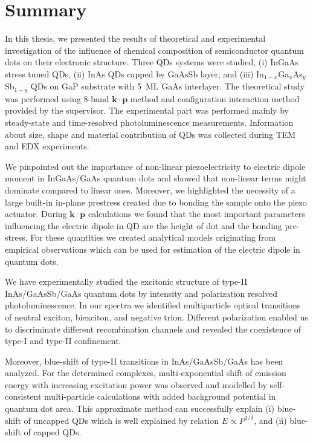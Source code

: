 
\chapter{Summary}\label{chap:summary}

In this thesis, we presented the results of theoretical and experimental investigation of the influence of chemical composition of semiconductor quantum dots on their electronic structure. Three QDs systems were studied, (i) InGaAs stress tuned QDs, (ii) InAs QDs capped by GaAsSb layer, and (iii) In$_{1-x}$Ga$_x$As$_y$Sb$_{1-y}$ QDs on GaP substrate with 5~ML GaAs interlayer. The theoretical study was performed using 8-band $\mathbf{k\cdot p}$ method and configuration interaction method provided by the supervisor. The experimental part was performed mainly by steady-state and time-resolved photoluminescence measurements. Information about size, shape and material contribution of QDs was collected during TEM and EDX experiments.

We pinpointed out the importance of non-linear piezoelectricity to electric dipole moment in InGaAs/GaAs quantum dots and showed that non-linear terms might dominate compared to linear ones. Moreover, we highlighted the necessity of a large built-in in-plane prestress created due to bonding the sample onto the piezo actuator. During $\mathbf{k\cdot p}$ calculations we found that the most important parameters influencing the electric dipole in QD are the height of dot and the bonding pre-stress. For these quantities we created analytical models originating from empirical observations which can be used for estimation of the electric dipole in quantum dots.

We have experimentally studied the excitonic structure of type-II InAs/GaAsSb/GaAs quantum dots by intensity and polarization resolved photoluminescence. In our spectra we identified multiparticle optical transitions of neutral exciton, biexciton, and negative trion. Different polarization enabled us to discriminate different recombination channels and revealed the coexistence of type-I and type-II confinement.

Moreover, blue-shift of type-II transitions in InAs/GaAsSb/GaAs has been analyzed. For the determined complexes, multi-exponential shift of emission energy with increasing excitation power was observed and modelled by self-consistent multi-particle calculations with added background potential in quantum dot area. This approximate method can successfully explain (i) blue-shift of uncapped QDs which is well explained by relation $E\propto P^{1/3}$, and (ii) blue-shift of capped QDs.

